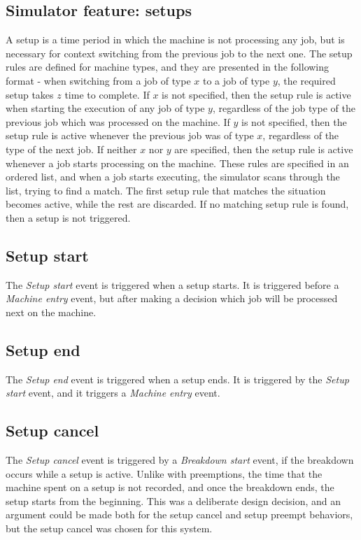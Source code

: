 \subsection{Simulator feature: setups}
A setup is a time period in which the machine is not processing any job, but is necessary for context switching from the previous job to the next one. The setup rules are defined for machine types, and they are presented in the following format - when switching from a job of type $x$ to a job of type $y$, the required setup takes $z$ time to complete. If $x$ is not specified, then the setup rule is active when starting the execution of any job of type $y$, regardless of the job type of the previous job which was processed on the machine. If $y$ is not specified, then the setup rule is active whenever the previous job was of type $x$, regardless of the type of the next job. If neither $x$ nor $y$ are specified, then the setup rule is active whenever a job starts processing on the machine. These rules are specified in an ordered list, and when a job starts executing, the simulator scans through the list, trying to find a match. The first setup rule that matches the situation becomes active, while the rest are discarded. If no matching setup rule is found, then a setup is not triggered.

\subsection{Setup start}
The \textit{Setup start} event is triggered when a setup starts. It is triggered before a \textit{Machine entry} event, but after making a decision which job will be processed next on the machine.

\subsection{Setup end}
The \textit{Setup end} event is triggered when a setup ends. It is triggered by the \textit{Setup start} event, and it triggers a \textit{Machine entry} event.

\subsection{Setup cancel}
The \textit{Setup cancel} event is triggered by a \textit{Breakdown start} event, if the breakdown occurs while a setup is active. Unlike with preemptions, the time that the machine spent on a setup is not recorded, and once the breakdown ends, the setup starts from the beginning. This was a deliberate design decision, and an argument could be made both for the setup cancel and setup preempt behaviors, but the setup cancel was chosen for this system.

